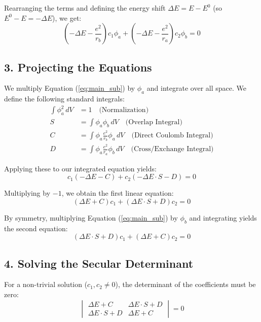 \documentclass{book}
\begin{document}
Rearranging the terms and defining the energy shift $\Delta E = E - E^0$ (so $E^0 - E = -\Delta E$), we get:
\begin{equation}
    \left( -\Delta E - \frac{e^2}{r_b} \right)c_1\phi_a + \left( -\Delta E - \frac{e^2}{r_a} \right)c_2\phi_b = 0 \label{eq:main_sub}
\end{equation}

\subsection*{3. Projecting the Equations}
We multiply Equation (\ref{eq:main_sub}) by $\phi_a$ and integrate over all space. We define the following standard integrals:
\begin{align*}
    \int \phi_a^2 \, dV &= 1 \quad \text{(Normalization)} \\
    S &= \int \phi_a \phi_b \, dV \quad \text{(Overlap Integral)} \\
    C &= \int \phi_a \frac{e^2}{r_b} \phi_a \, dV \quad \text{(Direct Coulomb Integral)} \\
    D &= \int \phi_a \frac{e^2}{r_a} \phi_b \, dV \quad \text{(Cross/Exchange Integral)}
\end{align*}
% 

Applying these to our integrated equation yields:
\begin{equation}
    c_1(-\Delta E - C) + c_2(-\Delta E \cdot S - D) = 0
\end{equation}

Multiplying by $-1$, we obtain the first linear equation:
\begin{equation}
    (\Delta E + C)c_1 + (\Delta E \cdot S + D)c_2 = 0 \label{eq:lin1}
\end{equation}

By symmetry, multiplying Equation (\ref{eq:main_sub}) by $\phi_b$ and integrating yields the second equation:
\begin{equation}
    (\Delta E \cdot S + D)c_1 + (\Delta E + C)c_2 = 0 \label{eq:lin2}
\end{equation}

\subsection*{4. Solving the Secular Determinant}
For a non-trivial solution ($c_1, c_2 \neq 0$), the determinant of the coefficients must be zero:
\begin{equation}
    \begin{vmatrix} 
        \Delta E + C & \Delta E \cdot S + D \\ 
        \Delta E \cdot S + D & \Delta E + C 
    \end{vmatrix} = 0
\end{equation}
% 
\end{document}

